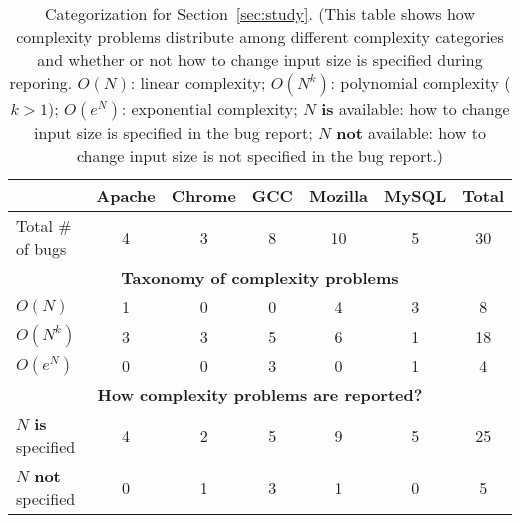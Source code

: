 \begin{table}[tb!]
\begin{adjustwidth}{-.5in}{-.5in}
\small
\centering
{
\begin{tabular}{|lcccccc|}
\hline
                                                               &   Apache  &   Chrome   &  GCC   &    Mozilla   &   MySQL  &  Total\\
\hline
Total \#  of bugs                                              &   4       &    3       &   8    &    10        &   5      &   30 \\
\hline
\multicolumn{7}{|c|}{\bf Taxonomy of complexity problems}\\
\multicolumn{1}{|l}{{\bf $O(N)$}}                              &   1       &    0       &   0    &    4         &   3      &   8\\
\multicolumn{1}{|l}{{\bf $O(N^k)$}}                            &   3       &    3       &   5    &    6         &   1      &  18\\
\multicolumn{1}{|l}{{\bf $O(e^N)$}}               &   0       &    0       &   3    &    0         &   1      &   4\\
\hline
\multicolumn{7}{|c|}{\bf How complexity problems are reported?}\\
\multicolumn{1}{|l}{$N$ {\bf is} specified}     &  4&2&5&9&5&25\\
\multicolumn{1}{|l}{$N$ {\bf not} specified}    &  0&1&3&1&0&5\\
\hline
\end{tabular}
}
\end{adjustwidth}
\caption{Categorization for Section~\ref{sec:study}.
(This table shows how complexity problems distribute among different complexity categories 
 and whether or not how to change input size is specified during reporing. $O(N)$: linear complexity;
 $O(N^k)$: polynomial complexity ($k>1$); $O(e^N)$: exponential complexity; 
 $N$ {\bf is} available: how to change input size is specified in the bug report;
 $N$ {\bf not} available: how to change input size is not specified in the bug report.)}
\label{tab:study}
\end{table}